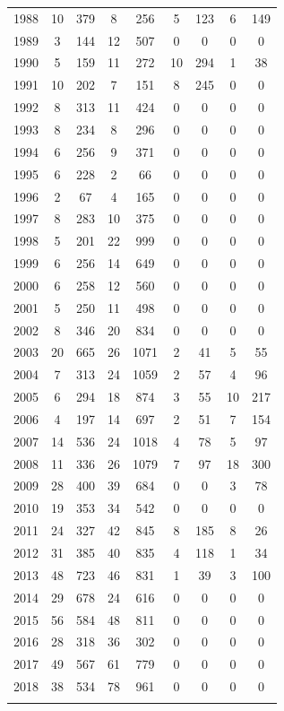 \documentclass[12pt,]{article}
\begin{document}
\begin{longtable}{ccccccccc}
  1988 & 10 & 379 & 8 & 256 & 5 & 123 & 6 & 149 \\ 
  1989 & 3 & 144 & 12 & 507 & 0 & 0 & 0 & 0 \\ 
  1990 & 5 & 159 & 11 & 272 & 10 & 294 & 1 & 38 \\ 
  1991 & 10 & 202 & 7 & 151 & 8 & 245 & 0 & 0 \\ 
  1992 & 8 & 313 & 11 & 424 & 0 & 0 & 0 & 0 \\ 
  1993 & 8 & 234 & 8 & 296 & 0 & 0 & 0 & 0 \\ 
  1994 & 6 & 256 & 9 & 371 & 0 & 0 & 0 & 0 \\ 
  1995 & 6 & 228 & 2 & 66 & 0 & 0 & 0 & 0 \\ 
  1996 & 2 & 67 & 4 & 165 & 0 & 0 & 0 & 0 \\ 
  1997 & 8 & 283 & 10 & 375 & 0 & 0 & 0 & 0 \\ 
  1998 & 5 & 201 & 22 & 999 & 0 & 0 & 0 & 0 \\ 
  1999 & 6 & 256 & 14 & 649 & 0 & 0 & 0 & 0 \\ 
  2000 & 6 & 258 & 12 & 560 & 0 & 0 & 0 & 0 \\ 
  2001 & 5 & 250 & 11 & 498 & 0 & 0 & 0 & 0 \\ 
  2002 & 8 & 346 & 20 & 834 & 0 & 0 & 0 & 0 \\ 
  2003 & 20 & 665 & 26 & 1071 & 2 & 41 & 5 & 55 \\ 
  2004 & 7 & 313 & 24 & 1059 & 2 & 57 & 4 & 96 \\ 
  2005 & 6 & 294 & 18 & 874 & 3 & 55 & 10 & 217 \\ 
  2006 & 4 & 197 & 14 & 697 & 2 & 51 & 7 & 154 \\ 
  2007 & 14 & 536 & 24 & 1018 & 4 & 78 & 5 & 97 \\ 
  2008 & 11 & 336 & 26 & 1079 & 7 & 97 & 18 & 300 \\ 
  2009 & 28 & 400 & 39 & 684 & 0 & 0 & 3 & 78 \\ 
  2010 & 19 & 353 & 34 & 542 & 0 & 0 & 0 & 0 \\ 
  2011 & 24 & 327 & 42 & 845 & 8 & 185 & 8 & 26 \\ 
  2012 & 31 & 385 & 40 & 835 & 4 & 118 & 1 & 34 \\ 
  2013 & 48 & 723 & 46 & 831 & 1 & 39 & 3 & 100 \\ 
  2014 & 29 & 678 & 24 & 616 & 0 & 0 & 0 & 0 \\ 
  2015 & 56 & 584 & 48 & 811 & 0 & 0 & 0 & 0 \\ 
  2016 & 28 & 318 & 36 & 302 & 0 & 0 & 0 & 0 \\ 
  2017 & 49 & 567 & 61 & 779 & 0 & 0 & 0 & 0 \\ 
  2018 & 38 & 534 & 78 & 961 & 0 & 0 & 0 & 0 \\ 
   \hline
\hline
\label{tab:Fishery_Ages}
\end{longtable}
\end{document}
